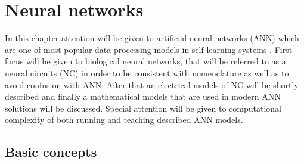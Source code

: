 \FloatBarrier
\chapter{Neural networks}

In this chapter attention will be given to artificial neural networks (ANN) which are one of most 
popular data processing models in self learning systems \cite{Abiodun2019} \cite{Tran2021}
\cite{Syed2021}. First focus will be given to biological neural networks, that will be referred 
to as a neural circuits (NC) in order to be consistent with nomenclature \cite{Purves2001} as 
well as to avoid confusion with ANN.  
After that an electrical models of NC will be shortly described and finally a mathematical models
that are used in modern ANN solutions will be discussed. Special attention will be given to 
computational complexity of both running and teaching described ANN models. 



\FloatBarrier
\section{Basic concepts}

\FloatBarrier
